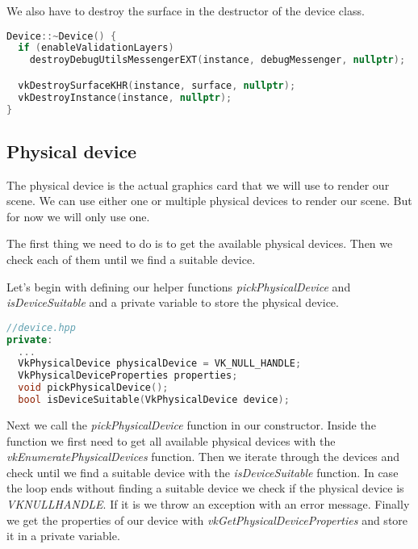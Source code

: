 \documentclass[12pt]{report} \usepackage{preamble}
\begin{document}
We also have to destroy the surface in the destructor of the device class.

\begin{lstlisting}[language=C++]
Device::~Device() {
  if (enableValidationLayers)
    destroyDebugUtilsMessengerEXT(instance, debugMessenger, nullptr);

  vkDestroySurfaceKHR(instance, surface, nullptr);
  vkDestroyInstance(instance, nullptr);
}
\end{lstlisting}

\subsection{Physical device}

The physical device is the actual graphics card that we will use to render our scene. We
can use either one or multiple physical devices to render our scene. But for now we will
only use one.

The first thing we need to do is to get the available physical devices. Then we check each of them
until we find a suitable device.

Let's begin with defining our helper functions \textit{pickPhysicalDevice} and \textit{isDeviceSuitable}
and a private variable to store the physical device.

\begin{lstlisting}[language=C++]
//device.hpp
private:
  ...
  VkPhysicalDevice physicalDevice = VK_NULL_HANDLE;
  VkPhysicalDeviceProperties properties;
  void pickPhysicalDevice();
  bool isDeviceSuitable(VkPhysicalDevice device);
\end{lstlisting}

Next we call the \textit{pickPhysicalDevice} function in our constructor. Inside the function we
first need to get all available physical devices with the \textit{vkEnumeratePhysicalDevices} function.
Then we iterate through the devices and check until we find a suitable device with the \textit{isDeviceSuitable}
function. In case the loop ends without finding a suitable device we check if the physical device is
\textit{VK\textunderscore NULL\textunderscore HANDLE}. If it is we throw an exception with an error message.
Finally we get the properties of our device with \textit{vkGetPhysicalDeviceProperties} and store it in a private variable.
\end{document}
